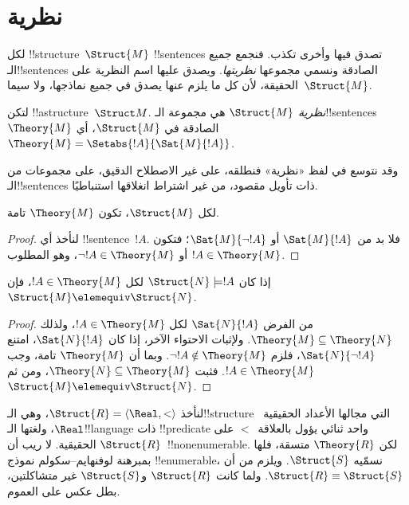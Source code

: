 \documentclass[../../../include/open-logic-section]{subfiles}
\begin{document}

\section{نظرية }

لكل !!{structure}~$\Struct{M}$ !!{sentence}s تصدق فيها
وأخرى تكذب. فنجمع جميع الـ!!{sentence}s الصادقة ونسمي مجموعها
\emph{نظريتها}. ويصدق عليها اسم النظرية على الحقيقة، لأن كل
ما يلزم عنها يصدق في جميع نماذجها، ولا سيما~$\Struct{M}$.

\begin{defn}
  لتكن !!a{structure}~$\Struct M$. \emph{نظرية} $\Struct{M}$ هي مجموعة
  الـ!!{sentence}s~$\Theory{M}$ الصادقة في $\Struct{M}$، أي
  $\Theory{M} = \Setabs{!A}{\Sat{M}{!A}}$.
\end{defn}

وقد نتوسع في لفظ «نظرية» فنطلقه، على غير الاصطلاح الدقيق، على مجموعات
من الـ!!{sentence}s ذات تأويل مقصود، من غير اشتراط انغلاقها استنباطيًا.

\begin{prop}
لكل $\Struct{M}$، تكون $\Theory{M}$ تامة.
\end{prop}

\begin{proof}
لنأخذ أي !!{sentence}~$!A$. فلا بد من $\Sat{M}{!A}$ أو
$\Sat{M}{\lnot !A}$؛ فتكون $!A \in \Theory{M}$ أو
$\lnot !A \in \Theory{M}$، وهو المطلوب.
\end{proof}

\begin{prop}
  إذا كان $\Struct{N} \models !A$ لكل $!A \in \Theory{M}$، فإن
  $\Struct{M} \elemequiv \Struct{N}$.
\end{prop}

\begin{proof}
من الفرض $\Sat{N}{!A}$ لكل $!A \in \Theory{M}$، ولذلك
$\Theory{M} \subseteq \Theory{N}$. ولإثبات الاحتواء الآخر،
إذا كان $\Sat{N}{!A}$، امتنع $\Sat{N}{\lnot !A}$، فلزم
$\lnot !A \notin \Theory{M}$. وبما أن $\Theory{M}$ تامة،
وجب $!A \in \Theory{M}$. فثبت
$\Theory{N} \subseteq \Theory{M}$، ومن ثم
$\Struct{M} \elemequiv \Struct{N}$.
\end{proof}

\begin{rem}
  لنأخذ $\Struct{R} = \langle\Real, <\rangle$، وهي الـ!!{structure}
  التي مجالها الأعداد الحقيقية~$\Real$، ولغتها الـ!!{language}
  ذات !!{predicate} واحد ثنائي يؤول بالعلاقة~$<$ على الحقيقية.
  لا ريب أن $\Struct{R}$~!!{nonenumerable}. لكن $\Theory{R}$
  متسقة، فلها بمبرهنة لوفنهايم--سكولم نموذج !!{enumerable}،
  نسمّيه $\Struct{S}$. ويلزم من  أن
  $\Struct{R} \equiv \Struct{S}$. ولما كانت $\Struct{R}$
  و$\Struct{S}$ غير متشاكلتين، بطل عكس 
  على العموم.
\end{rem}
\end{document}

